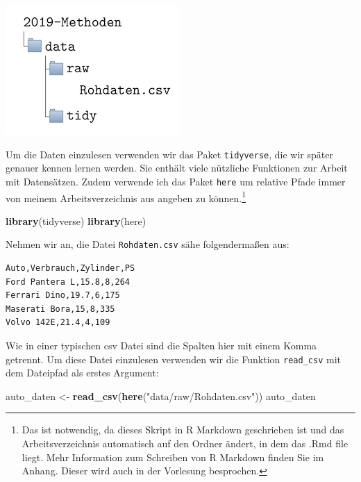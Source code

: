 \documentclass[]{book}
\newenvironment{Shaded}{\begin{snugshade}}{\end{snugshade}}
\newcommand{\KeywordTok}[1]{\textcolor[rgb]{0.13,0.29,0.53}{\textbf{#1}}}
\newcommand{\StringTok}[1]{\textcolor[rgb]{0.31,0.60,0.02}{#1}}
\newcommand{\NormalTok}[1]{#1}
\let\rmarkdownfootnote\footnote%
\def\footnote{\protect\rmarkdownfootnote}
\begin{document}
\begin{center}\includegraphics[width=0.5\linewidth]{figures/chap3-data-folder} \end{center}

Um die Daten einzulesen verwenden wir das Paket \texttt{tidyverse}, die
wir später genauer kennen lernen werden. Sie enthält viele nützliche
Funktionen zur Arbeit mit Datensätzen. Zudem verwende ich das Paket
\texttt{here} um relative Pfade immer von meinem Arbeitsverzeichnis aus
angeben zu können.\footnote{Das ist notwendig, da dieses Skript in R
  Markdown geschrieben ist und das Arbeitsverzeichnis automatisch auf
  den Ordner ändert, in dem das .Rmd file liegt. Mehr Information zum
  Schreiben von R Markdown finden Sie im Anhang. Dieser wird auch in der
  Vorlesung besprochen.}

\begin{Shaded}
\begin{Highlighting}[]
\KeywordTok{library}\NormalTok{(tidyverse)}
\KeywordTok{library}\NormalTok{(here)}
\end{Highlighting}
\end{Shaded}

Nehmen wir an, die Datei \texttt{Rohdaten.csv} sähe folgendermaßen aus:

\begin{verbatim}
Auto,Verbrauch,Zylinder,PS
Ford Pantera L,15.8,8,264
Ferrari Dino,19.7,6,175
Maserati Bora,15,8,335
Volvo 142E,21.4,4,109
\end{verbatim}

Wie in einer typischen csv Datei sind die Spalten hier mit einem Komma
getrennt. Um diese Datei einzulesen verwenden wir die Funktion
\texttt{read\_csv} mit dem Dateipfad als erstes Argument:

\begin{Shaded}
\begin{Highlighting}[]
\NormalTok{auto_daten <-}\StringTok{ }\KeywordTok{read_csv}\NormalTok{(}\KeywordTok{here}\NormalTok{(}\StringTok{"data/raw/Rohdaten.csv"}\NormalTok{))}
\NormalTok{auto_daten}
\end{Highlighting}
\end{Shaded}
\end{document}
